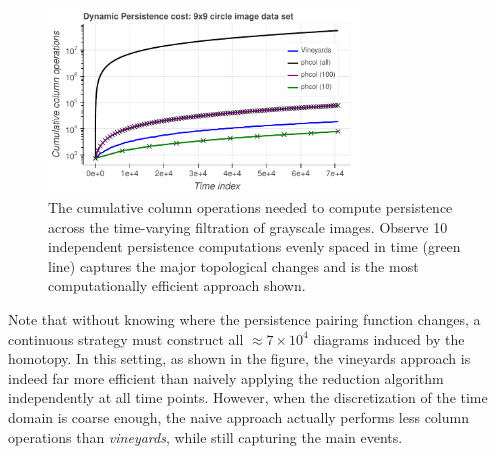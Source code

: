 \documentclass[sn-mathphys]{sn-jnl}
\begin{document}
\begin{figure}[!htb]
 	\centering
 	\includegraphics[width=0.75\textwidth]{circle_vineyards_vector.pdf}
 	\caption{The cumulative column operations needed to compute persistence across the time-varying filtration of grayscale images. Observe 10 independent persistence computations evenly spaced in time (green line) captures the major topological changes and is the most computationally efficient approach shown.}
 	\label{fig:vineyards}
 \end{figure}

Note that without knowing where the persistence pairing function changes, a continuous strategy must construct all $\approx 7 \times 10^{4}$ diagrams induced by the homotopy. 
In this setting, as shown in the figure, the vineyards approach is indeed far more efficient than naively applying the reduction algorithm independently at all time points.
However, when the discretization of the time domain is coarse enough, the naive approach actually performs less column operations than \emph{vineyards}, while still capturing the main events. 
  
\end{document}
